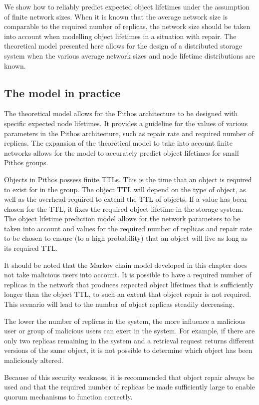We show how to reliably predict expected object lifetimes under the assumption of finite network sizes. When it is known that the average network size is comparable to the required number of replicas, the network size should be taken into account when modelling object lifetimes in a situation with repair. The theoretical model presented here allows for the design of a distributed storage system when the various average network sizes and node lifetime distributions are known.

\subsection{The model in practice}

The theoretical model allows for the Pithos architecture to be designed with specific expected node lifetimes. It provides a guideline for the values of various parameters in the Pithos architecture, such as repair rate and required number of replicas. The expansion of the theoretical model to take into account finite networks allows for the model to accurately predict object lifetimes for small Pithos groups.

Objects in Pithos possess finite TTLs. This is the time that an object is required to exist for in the group. The object TTL will depend on the type of object, as well as the overhead required to extend the TTL of objects. If a value has been chosen for the TTL, it fixes the required object lifetime in the storage system. The object lifetime prediction model allows for the network parameters to be taken into account and values for the required number of replicas and repair rate to be chosen to ensure (to a high probability) that an object will live as long as its required TTL.

It should be noted that the Markov chain model developed in this chapter does not take malicious users into account. It is possible to have a required number of replicas in the network that produces expected object lifetimes that is sufficiently longer than the object TTL, to such an extent that object repair is not required. This scenario will lead to the number of object replicas steadily decreasing.

The lower the number of replicas in the system, the more influence a malicious user or group of malicious users can exert in the system. For example, if there are only two replicas remaining in the system and a retrieval request returns different versions of the same object, it is not possible to determine which object has been maliciously altered.

Because of this security weakness, it is recommended that object repair always be used and that the required number of replicas be made sufficiently large to enable quorum mechanisms to function correctly.